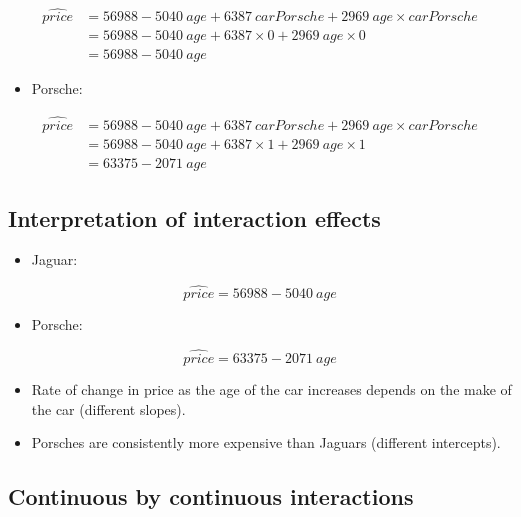 \documentclass[
]{article}
\providecommand{\tightlist}{%
  \setlength{\itemsep}{0pt}\setlength{\parskip}{0pt}}
\begin{document}
\[\begin{align}\widehat{price} &= 56988 - 5040~age + 6387~carPorsche + 2969~age \times carPorsche \\
&= 56988 - 5040~age + 6387 \times 0 + 2969~age \times 0\\
&= 56988 - 5040~age\end{align}\]

\begin{itemize}
\tightlist
\item
  Porsche:
\end{itemize}

\[\begin{align}\widehat{price} &= 56988 - 5040~age + 6387~carPorsche + 2969~age \times carPorsche \\
&= 56988 - 5040~age + 6387 \times 1 + 2969~age \times 1\\
&= 63375 - 2071~age\end{align}\]

\hypertarget{interpretation-of-interaction-effects-1}{%
\subsection{Interpretation of interaction
effects}\label{interpretation-of-interaction-effects-1}}

\begin{itemize}
\tightlist
\item
  Jaguar:
\end{itemize}

\[\widehat{price} = 56988 - 5040~age\]

\begin{itemize}
\tightlist
\item
  Porsche:
\end{itemize}

\[\widehat{price} = 63375 - 2071~age\]

\begin{itemize}
\item
  Rate of change in price as the age of the car increases depends on the
  make of the car (different slopes).
\item
  Porsches are consistently more expensive than Jaguars (different
  intercepts).
\end{itemize}

\hypertarget{continuous-by-continuous-interactions}{%
\subsection{Continuous by continuous
interactions}\label{continuous-by-continuous-interactions}}
\end{document}
